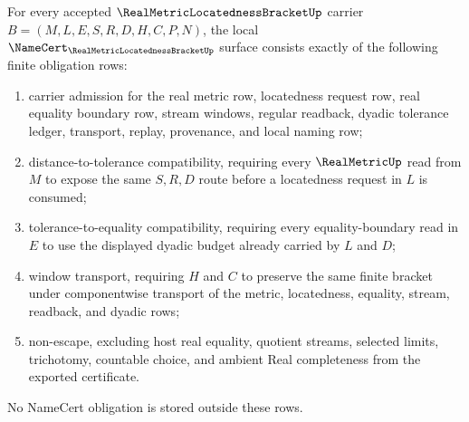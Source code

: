 \begin{theorem}
\label{thm:real-metric-locatedness-bracket-namecert-obligations}
For every accepted $\RealMetricLocatednessBracketUp$ carrier $B=(M,L,E,S,R,D,H,C,P,N)$, the local $\NameCert_{\RealMetricLocatednessBracketUp}$ surface consists exactly of the following finite obligation rows:
\begin{enumerate}
\item carrier admission for the real metric row, locatedness request row, real equality boundary row, stream windows, regular readback, dyadic tolerance ledger, transport, replay, provenance, and local naming row;
\item distance-to-tolerance compatibility, requiring every $\RealMetricUp$ read from $M$ to expose the same $S,R,D$ route before a locatedness request in $L$ is consumed;
\item tolerance-to-equality compatibility, requiring every equality-boundary read in $E$ to use the displayed dyadic budget already carried by $L$ and $D$;
\item window transport, requiring $H$ and $C$ to preserve the same finite bracket under componentwise transport of the metric, locatedness, equality, stream, readback, and dyadic rows;
\item non-escape, excluding host real equality, quotient streams, selected limits, trichotomy, countable choice, and ambient Real completeness from the exported certificate.
\end{enumerate}
No NameCert obligation is stored outside these rows.
\end{theorem}
